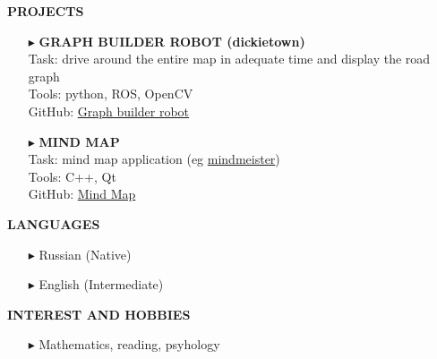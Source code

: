 \documentclass[a4paper,10pt]{article}
\begin{document}
	 \colorbox{magicmint}{
		\begin{minipage}{0.96\textwidth}
			\textbf{PROJECTS}
		\end{minipage}
	}
	\begin{itemize}
	
		\item[$\blacktriangleright$] \textbf{GRAPH BUILDER ROBOT (dickietown)}\\
		Task: drive around the entire map in adequate time and display the road graph\\
		Tools: python, ROS, OpenCV\\
		GitHub: \href{https://github.com/Kira5005-code/template-ros-core} {Graph builder robot}
		\item[$\blacktriangleright$] \textbf{MIND MAP}\\
		Task: mind map application (eg \href{https://www.mindmeister.com} {mindmeister})\\
		Tools: C++, Qt\\
		GitHub: \href{https://github.com/Kira5005-code/Mind-Map} {Mind Map}
		
	\end{itemize}
	
	\colorbox{magicmint}{
		\begin{minipage}{0.96\textwidth}
			\textbf{LANGUAGES}
		\end{minipage}
	}
	\begin{itemize}
		\item[$\blacktriangleright$]  Russian (Native)
		\item[$\blacktriangleright$]  English (Intermediate)
	\end{itemize}
	
	
	\colorbox{magicmint}{
		\begin{minipage}{0.96\textwidth}
			\textbf{INTEREST AND HOBBIES}
		\end{minipage}
	}
	\begin{itemize}
		\item[$\blacktriangleright$]  Mathematics, reading, psyhology
	\end{itemize}
	
\end{document}
